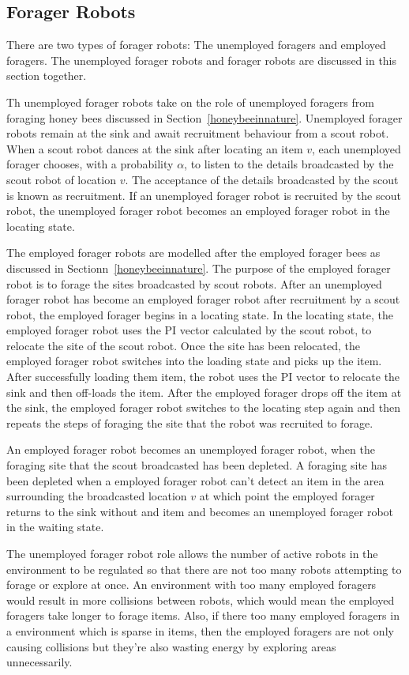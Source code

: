 \subsection{Forager Robots}

There are two types of forager robots: The unemployed foragers and employed foragers. The unemployed forager robots and forager robots are discussed in this section together.

Th unemployed forager robots take on the role of unemployed foragers from foraging honey bees discussed in Section~\ref{honeybeeinnature}.
Unemployed forager robots remain at the sink and await recruitment behaviour from a scout robot. When a scout robot dances at the sink after locating an item $v$, each unemployed forager chooses, with a probability $\alpha$, to listen to the details broadcasted by the scout robot of location $v$. The acceptance of the details broadcasted by the scout is known as recruitment. If an unemployed forager robot is recruited by the scout robot, the unemployed forager robot becomes an employed forager robot in the locating state.

The employed forager robots are modelled after the employed forager bees as discussed in Sectionn~\ref{honeybeeinnature}. The purpose of the employed forager robot is to forage the sites broadcasted by scout robots. After an unemployed forager robot has become an employed forager robot after recruitment by a scout robot, the employed forager begins in a locating state. In the locating state, the employed forager robot uses the PI vector calculated by the scout robot, to relocate the site of the scout robot. Once the site has been relocated, the employed forager robot switches into the loading state and picks up the item. After successfully loading them item, the robot uses the PI vector to relocate the sink and then off-loads the item. After the employed forager drops off the item at the sink, the employed forager robot switches to the locating step again and then repeats the steps of foraging the site that the robot was recruited to forage.

An employed forager robot becomes an unemployed forager robot, when the foraging site that the scout broadcasted has been depleted. A foraging site has been depleted when a employed forager robot can't detect an item in the area surrounding the broadcasted location $v$ at which point the employed forager returns to the sink without and item and becomes an unemployed forager robot in the waiting state. 

The unemployed forager robot role allows the number of active robots in the environment to be regulated so that there are not too many robots attempting to forage or explore at once. An environment with too many employed foragers would result in more collisions between robots, which would mean the employed foragers take longer to forage items. Also, if there too many employed foragers in a environment which is sparse in items, then the employed foragers are not only causing collisions but they're also wasting energy by exploring areas unnecessarily.

